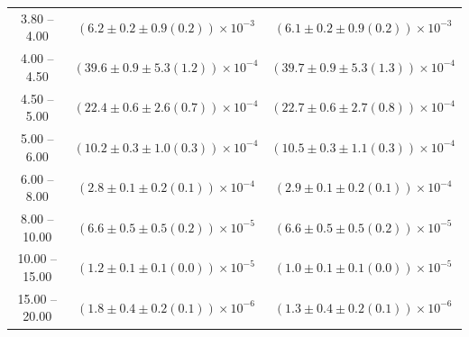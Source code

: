 \begin{table}
\begin{center}
\begin{tabular}{ c | c c }
3.80 -- 4.00 & $(6.2\pm0.2\pm0.9(0.2))\times10^{-3}$ & $(6.1\pm0.2\pm0.9(0.2))\times10^{-3}$ \\ 
4.00 -- 4.50 & $(39.6\pm0.9\pm5.3(1.2))\times10^{-4}$ & $(39.7\pm0.9\pm5.3(1.3))\times10^{-4}$ \\ 
4.50 -- 5.00 & $(22.4\pm0.6\pm2.6(0.7))\times10^{-4}$ & $(22.7\pm0.6\pm2.7(0.8))\times10^{-4}$ \\ 
5.00 -- 6.00 & $(10.2\pm0.3\pm1.0(0.3))\times10^{-4}$ & $(10.5\pm0.3\pm1.1(0.3))\times10^{-4}$ \\ 
6.00 -- 8.00 & $(2.8\pm0.1\pm0.2(0.1))\times10^{-4}$ & $(2.9\pm0.1\pm0.2(0.1))\times10^{-4}$ \\ 
8.00 -- 10.00 & $(6.6\pm0.5\pm0.5(0.2))\times10^{-5}$ & $(6.6\pm0.5\pm0.5(0.2))\times10^{-5}$ \\ 
10.00 -- 15.00 & $(1.2\pm0.1\pm0.1(0.0))\times10^{-5}$ & $(1.0\pm0.1\pm0.1(0.0))\times10^{-5}$ \\ 
15.00 -- 20.00 & $(1.8\pm0.4\pm0.2(0.1))\times10^{-6}$ & $(1.3\pm0.4\pm0.2(0.1))\times10^{-6}$ \\ 
\hline
\end{tabular}
\end{center}
\end{table}
 
